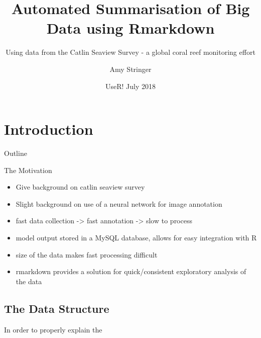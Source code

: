 \documentclass{beamer}
\title{Automated Summarisation of Big Data using Rmarkdown}
\subtitle{Using data from the Catlin Seaview Survey - a global coral reef monitoring effort}
\author{Amy Stringer}
\institute[Global Change Institute] %
{
  \inst{1}%
  University of Queensland
}
\date{UseR! July 2018}
\begin{document}
    \section{Introduction}
        \begin{frame}
          \titlepage
        \end{frame}

        \begin{frame}{Outline}
          \tableofcontents
        \end{frame}

        \begin{frame}{The Motivation}
            \begin{itemize}
              \item Give background on catlin seaview survey
              \item Slight background on use of a neural network for image annotation
              \item fast data collection -> fast annotation -> slow to process
              \item model output stored in a MySQL database, allows for easy integration with R
              \item size of the data makes fast processing difficult
              \item rmarkdown provides a solution for quick/consistent exploratory analysis of the data
            \end{itemize}
        \end{frame}

    \subsection{The Data Structure}
        In order to properly explain the 




    \subsection{}


\end{document}
